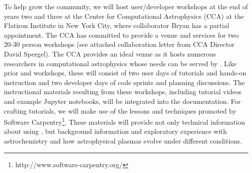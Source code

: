 To help grow the \grackle{} community, we will host user/developer
workshops at the end of years two and three at the Center for
Computational Astrophysics (CCA) at the Flatiron Institute in New York
City, where collaborator Bryan has a partial appointment.  The CCA has
committed to provide a venue and services for two 20-30 person
workshops (see attached collaboration letter from CCA Director David
Spergel).  The CCA provides an
ideal venue as it hosts numerous researchers in computational
astrophysics whose needs can be served by \grackle{}.  Like prior
\enzo{} and \yt{} workshops, these will consist of two user days of
tutorials and hands-on instruction and two developer days of code
sprints and planning discussions.  The instructional materials
resulting from these workshops, including tutorial videos and example
Jupyter notebooks, will be integrated into the \grackle{}
documentation. For crafting tutorials, we will make use of the lessons
and techniques promoted by Software
Carpentry\footnote{http://www.software-carpentry.org/}.  These materials will
provide not only technical information about using \grackle{}, but background
information and exploratory experience with astrochemistry and how
astrophysical plasmas evolve under different conditions.
